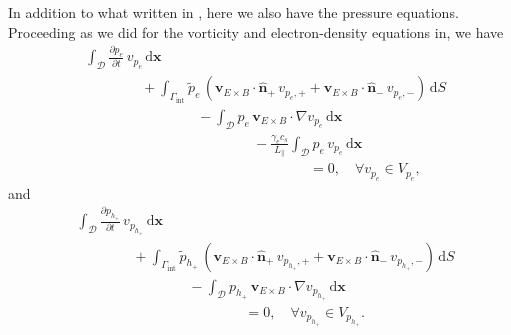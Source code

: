 \documentclass[12pt]{article}
\begin{document}
In addition to what written in , here we also have the pressure equations. Proceeding as we did for the vorticity and electron-density equations in, we have
%
\begin{equation}
    \begin{aligned}
        & \int_\mathcal{D} \frac{\partial p_e}{\partial t} \, v_{p_e} \, \mathrm{d}\bm{x} \\
        & \hspace{4em} + \int_{\Gamma_\text{int}} \tilde{p}_e \, ( \bm{v}_{E \times B} \cdot \hat{\bm{n}}_+ \, v_{p_e,+} + \bm{v}_{E \times B} \cdot \hat{\bm{n}}_- \, v_{p_e,-} ) \, \mathrm{d}S \\
        & \hspace{8em} - \int_\mathcal{D} p_e \, \bm{v}_{E \times B} \cdot \nabla v_{p_e} \, \mathrm{d}\bm{x} \\
        & \hspace{12em} - \frac{\gamma_e c_s}{L_\parallel} \int_\mathcal{D} p_e \, v_{p_e} \, \mathrm{d}\bm{x} \\
        & \hspace{16em} = 0 , \quad \forall v_{p_e} \in V_{p_e} ,
    \end{aligned}
\end{equation}
%
and
%
\begin{equation}
    \begin{aligned}
        & \int_\mathcal{D} \frac{\partial p_{h_+}}{\partial t} \, v_{p_{h_+}} \, \mathrm{d}\bm{x} \\
        & \hspace{4em} + \int_{\Gamma_\text{int}} \tilde{p}_{h_+} \, ( \bm{v}_{E \times B} \cdot \hat{\bm{n}}_+ \, v_{p_{h_+},+} + \bm{v}_{E \times B} \cdot \hat{\bm{n}}_- \, v_{p_{h_+},-} ) \, \mathrm{d}S \\
        & \hspace{8em} - \int_\mathcal{D} p_{h_+} \, \bm{v}_{E \times B} \cdot \nabla v_{p_{h_+}} \, \mathrm{d}\bm{x} \\
        & \hspace{12em} = 0 , \quad \forall v_{p_{h_+}} \in V_{p_{h_+}} .
    \end{aligned}
\end{equation}
\end{document}
